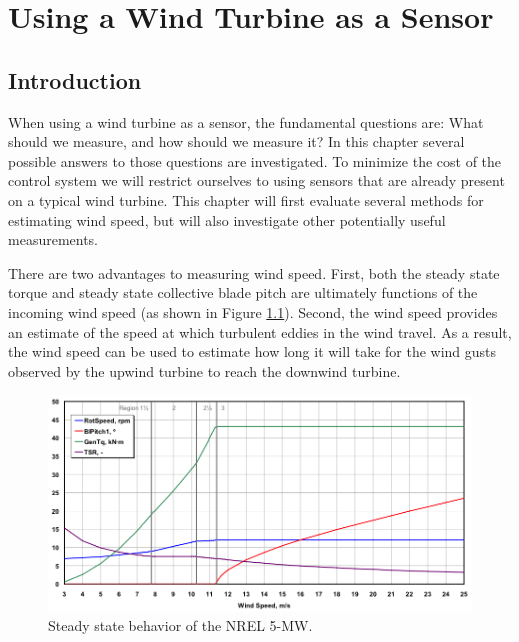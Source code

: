 
\chapter{Using a Wind Turbine as a Sensor} %

\label{Chapter2} %



\section{Introduction}

When using a wind turbine as a sensor, the fundamental questions are: What should we measure, and how should we measure it? In this chapter several possible answers to those questions are investigated. To minimize the cost of the control system we will restrict ourselves to using sensors that are already present on a typical wind turbine. This chapter will first evaluate several methods for estimating wind speed, but will also investigate other potentially useful measurements.

There are two advantages to measuring wind speed.  First, both the steady state torque and steady state collective blade pitch are ultimately functions of the incoming wind speed (as shown in Figure \ref{fig2-1}).  Second, the wind speed provides an estimate of the speed at which turbulent eddies in the wind travel. As a result, the wind speed can be used to estimate how long it will take for the wind gusts observed by the upwind turbine to reach the downwind turbine. 


\begin{figure}[htbp]
	\centering
		\includegraphics[width=\linewidth]{Figures/ch2Figures/fig2-1.png}
		
	\caption{Steady state behavior of the NREL 5-MW.\cite{jonkman2009}}
	\label{fig2-1}
\end{figure}

